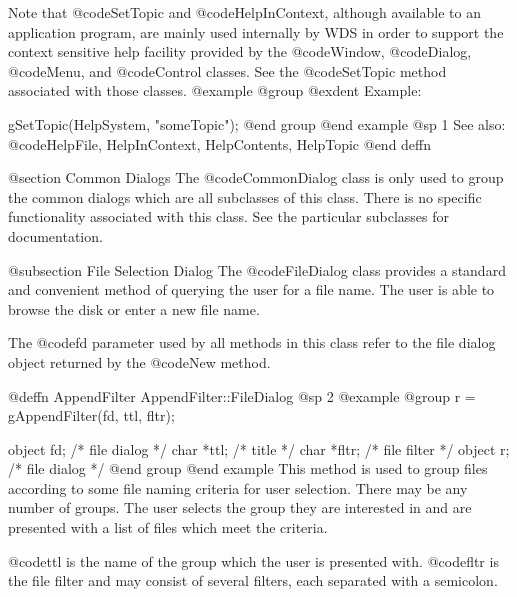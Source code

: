 Note that @code{SetTopic} and @code{HelpInContext}, although available
to an application program, are mainly used internally by WDS in order to
support the context sensitive help facility provided by the @code{Window},
@code{Dialog}, @code{Menu}, and @code{Control} classes.  See the
@code{SetTopic} method associated with those classes.
@example
@group
@exdent Example:

gSetTopic(HelpSystem, "someTopic");
@end group
@end example
@sp 1
See also:  @code{HelpFile, HelpInContext, HelpContents, HelpTopic}
@end deffn










@section Common Dialogs
The @code{CommonDialog} class is only used to group the common dialogs
which are all subclasses of this class.  There is no specific
functionality associated with this class.  See the particular subclasses
for documentation.






@subsection File Selection Dialog
The @code{FileDialog} class provides a standard and convenient method of
querying the user for a file name.  The user is able to browse the disk
or enter a new file name.

The @code{fd} parameter used by all methods in this class refer to
the file dialog object returned by the @code{New} method.














@deffn {AppendFilter} AppendFilter::FileDialog
@sp 2
@example
@group
r = gAppendFilter(fd, ttl, fltr);

object  fd;     /*  file dialog  */
char    *ttl;   /*  title        */
char    *fltr;  /*  file filter  */
object  r;      /*  file dialog  */
@end group
@end example
This method is used to group files according to some file naming
criteria for user selection.  There may be any number of groups.  The
user selects the group they are interested in and are presented with
a list of files which meet the criteria.

@code{ttl} is the name of the group which the user is presented with.
@code{fltr} is the file filter and may consist of several filters,
each separated with a semicolon.


